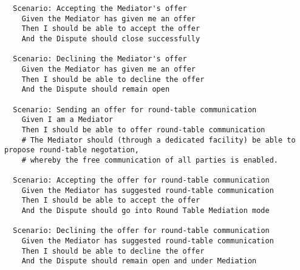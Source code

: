 \begin{lstlisting}
  Scenario: Accepting the Mediator's offer
    Given the Mediator has given me an offer
    Then I should be able to accept the offer
    And the Dispute should close successfully

  Scenario: Declining the Mediator's offer
    Given the Mediator has given me an offer
    Then I should be able to decline the offer
    And the Dispute should remain open

  Scenario: Sending an offer for round-table communication
    Given I am a Mediator
    Then I should be able to offer round-table communication
    # The Mediator should (through a dedicated facility) be able to propose round-table negotation,
    # whereby the free communication of all parties is enabled.

  Scenario: Accepting the offer for round-table communication
    Given the Mediator has suggested round-table communication
    Then I should be able to accept the offer
    And the Dispute should go into Round Table Mediation mode

  Scenario: Declining the offer for round-table communication
    Given the Mediator has suggested round-table communication
    Then I should be able to decline the offer
    And the Dispute should remain open and under Mediation
\end{lstlisting}
